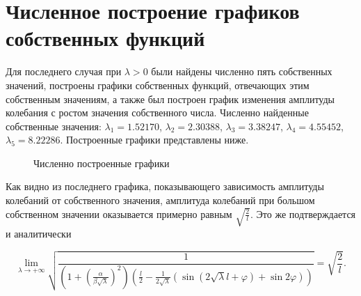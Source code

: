 \documentclass[12pt, a4paper]{article}
\begin{document}
\section{Численное построение графиков собственных функций}
Для последнего случая при $\lambda > 0$ были найдены численно пять собственных значений, построены графики собственных функций, отвечающих этим собственным значениям, а также был построен график изменения амплитуды колебания с ростом значения собственного числа.
\newline
Численно найденные собственные значения: $\lambda_{1} = 1.52170$, $\lambda_{2} = 2.30388$, $\lambda_{3} = 3.38247$, $\lambda_{4} = 4.55452$, $\lambda_{5} = 8.22286$.
\newline
Построенные графики представлены ниже.

\begin{figure}[h!]
	\caption{Численно построенные графики}
\end{figure}

Как видно из последнего графика, показывающего зависимость амплитуды колебаний от собственного значения, амплитуда колебаний при большом собственном значении оказывается примерно равным $\sqrt{\frac{2}{l}}$. Это же подтверждается и аналитически

\[ \lim\limits_{\lambda \to +\infty} \sqrt{\frac{1}{(1 + (\frac{\alpha}{\beta \sqrt{\lambda}})^2) (\frac{l}{2} - \frac{1}{2\sqrt{\lambda}} (\sin (2\sqrt{\lambda}l + \varphi) + \sin 2\varphi))}} =  \sqrt{\frac{2}{l}}. \]
\end{document}
